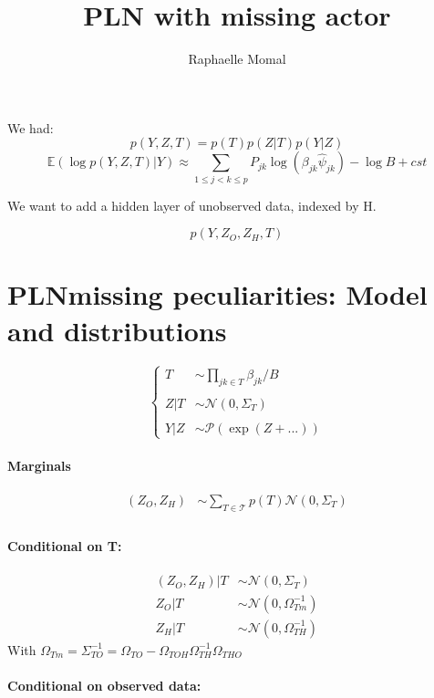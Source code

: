\documentclass[11pt,a4paper]{article}
\author{Raphaelle Momal}
\title{PLN with missing actor}
\newcommand{\Esp}{\mathds{E}}
\begin{document}
\maketitle


We had: 
$$ p(Y,Z,T) = p(T)p(Z|T)p(Y|Z)$$
$$ \Esp(\log p(Y,Z,T)|Y) \approx \sum_{1 \leq j < k \leq p} P_{jk} \log\left(\beta_{jk} \hat{\psi}_{jk}\right) - \log B + cst$$

We want to add a hidden layer of unobserved data, indexed by H.

$$ p(Y,Z_O,Z_H,T)$$
\section{PLNmissing peculiarities: Model and distributions}
$$\left\{\begin{array}{rl}
T & \sim\prod_{jk \in T} \beta_{jk}/B \\\\

Z|T& \sim\mathcal{N}(0,\Sigma_T)\\\\

Y|Z&\sim\mathcal{P}( \exp( Z+...) )
\end{array} \right.$$

\paragraph{Marginals}
\begin{align*}
(Z_O,Z_H) &\sim \sum_{T \in \mathcal{T}} p(T) \mathcal{N}(0,\Sigma_T) \\
\end{align*}

\paragraph{Conditional on T:}
\begin{align*}
(Z_O,Z_H)|T & \sim\mathcal{N}(0,\Sigma_T)\\
Z_O|T & \sim\mathcal{N}(0,\Omega_{Tm}^{-1})\\
Z_H|T & \sim\mathcal{N}(0,\Omega_{TH}^{-1})
\end{align*}
With $ \Omega_{Tm} =\Sigma_{TO}^{-1} =  \Omega_{TO} - \Omega_{TOH}\Omega_{TH}^{-1}\Omega_{THO}$


\paragraph{Conditional on observed data:\\}
\end{document}

